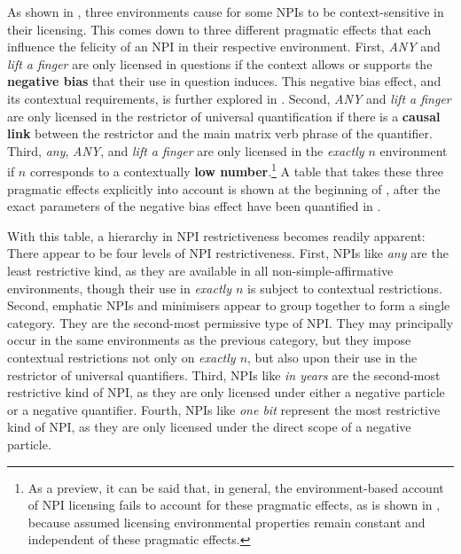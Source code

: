\noindent As shown in , three environments cause for some NPIs to be context-sensitive in their licensing. This comes down to three different pragmatic effects that each influence the felicity of an NPI in their respective environment. First, \textit{ANY} and \textit{lift a finger} are only licensed in questions if the context allows or supports the \textbf{negative bias} that their use in question induces. This negative bias effect, and its contextual requirements, is further explored in . Second, \textit{ANY} and \textit{lift a finger} are only licensed in the restrictor of universal quantification if there is a \textbf{causal link} between the restrictor and the main matrix verb phrase of the quantifier. Third, \textit{any}, \textit{ANY}, and \textit{lift a finger} are only licensed in the \textit{exactly $n$} environment if $n$ corresponds to a contextually \textbf{low number}.\footnote{As a preview, it can be said that, in general, the environment-based account of NPI licensing fails to account for these pragmatic effects, as is shown in , because assumed licensing environmental properties remain constant and independent of these pragmatic effects.}
A table that takes these three pragmatic effects explicitly into account is shown at the beginning of , after the exact parameters of the negative bias effect have been quantified in .

\noindent With this table, a hierarchy in NPI restrictiveness becomes readily apparent: There appear to be four levels of NPI restrictiveness. First, NPIs like \textit{any} are the least restrictive kind, as they are available in all non-simple-affirmative environments, though their use in \textit{exactly $n$} is subject to contextual restrictions. Second, emphatic NPIs and minimisers appear to group together to form a single category. They are the second-most permissive type of NPI. They may principally occur in the same environments as the previous category, but they impose contextual restrictions not only on \textit{exactly $n$}, but also upon their use in the restrictor of universal quantifiers. Third, NPIs like \textit{in years} are the second-most restrictive kind of NPI, as they are only licensed under either a negative particle or a negative quantifier. Fourth, NPIs like \textit{one bit} represent the most restrictive kind of NPI, as they are only licensed under the direct scope of a negative particle.

